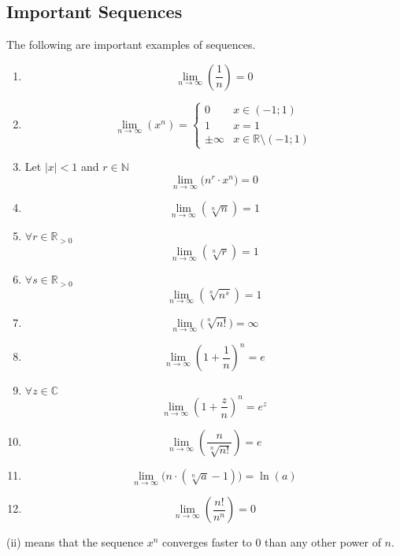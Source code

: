 \subsection{Important Sequences}
\begin{proposition}
   The following are important examples of sequences.

   \begin{enumerate}[label=\roman*, align=Center]
      \item \[\lim_{n \to \infty} \left(\frac{1}{n}\right) = 0\]
      \item \[\lim_{n \to \infty}(x^n) = \begin{cases}
               0 & x \in (-1; 1)\\
               1 & x = 1\\
               \pm\infty & x \in \mathbb{R}\setminus (-1;1)
         \end{cases}\]
      \item Let \(|x| < 1\) and \(r \in \mathbb{N}\)
         \[\lim_{n \to \infty}\big(n^r \cdot x^n\big) = 0\]
      \item \[\lim_{n \to \infty}(\sqrt[n]{n}) = 1\]
      \item \(\forall r \in \mathbb{R}_{>0}\)
         \[\lim_{n \to \infty}(\sqrt[n]{r}) = 1\]
      \item \(\forall s \in \mathbb{R}_{>0}\)
         \[\lim_{n \to \infty}(\sqrt[n]{n^s}) = 1\]
      \item \[\lim_{n \to \infty}\big(\sqrt[n]{n!}\big) = \infty\]
      \item \[\lim_{n \to \infty}\left(1 + \frac{1}{n}\right)^n = e\]
      \item \(\forall z \in \mathbb{C}\)
         \[\lim_{n \to \infty}\left(1 + \frac{z}{n}\right)^n = e^z\]
      \item \[\lim_{n \to \infty}\left(\frac{n}{\sqrt[n]{n!}}\right) = e\]
      \item \[\lim_{n \to \infty}\big(n \cdot (\sqrt[n]{a} - 1)\big) = \ln(a)\]
      \item
         \[\lim_{n \to \infty}\left(\frac{n!}{n^n}\right) = 0\]
   \end{enumerate}
\end{proposition}
\begin{remark}
   (ii) means that the sequence \(x^n\) converges faster to 0 than any other power of \(n\).
\end{remark}
